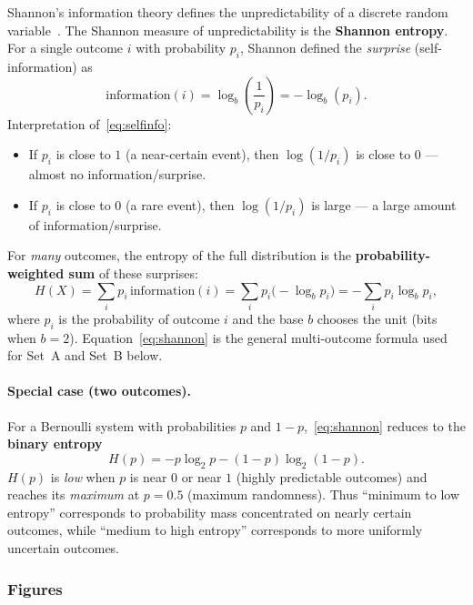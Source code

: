 \documentclass[12pt,a4paper]{article}
\begin{document}
Shannon's information theory defines the unpredictability of a discrete
random variable~\cite{He2018}. The Shannon measure of unpredictability is the
\textbf{Shannon entropy}. For a single outcome \(i\) with probability \(p_i\),
Shannon defined the \emph{surprise} (self-information) as
\begin{equation}
  \mathrm{information}(i)
    = \log_b\!\left(\frac{1}{p_i}\right)
    = -\log_b(p_i).
  \label{eq:selfinfo}
\end{equation}
Interpretation of~\eqref{eq:selfinfo}:
\begin{itemize}
  \item If \(p_i\) is close to \(1\) (a near-certain event), then
        \(\log(1/p_i)\) is close to \(0\) --- almost no information/surprise.
  \item If \(p_i\) is close to \(0\) (a rare event), then
        \(\log(1/p_i)\) is large --- a large amount of information/surprise.
\end{itemize}

For \emph{many} outcomes, the entropy of the full distribution is the
\textbf{probability-weighted sum} of these surprises:
\begin{equation}
  H(X)
    = \sum_{i} p_i \,\mathrm{information}(i)
    = \sum_{i} p_i \bigl(-\log_b p_i\bigr)
    = -\sum_{i} p_i \log_b p_i,
  \label{eq:shannon}
\end{equation}
where \(p_i\) is the probability of outcome \(i\) and the base \(b\) chooses
the unit (bits when \(b=2\)). Equation~\eqref{eq:shannon} is the general
multi-outcome formula used for Set~A and Set~B below.

\paragraph{Special case (two outcomes).}
For a Bernoulli system with probabilities \(p\) and \(1-p\),~\eqref{eq:shannon}
reduces to the \textbf{binary entropy}
\begin{equation}
  H(p) = -p\log_2 p - (1-p)\log_2(1-p).
\end{equation}
\(H(p)\) is \emph{low} when \(p\) is near \(0\) or near \(1\) (highly
predictable outcomes) and reaches its \emph{maximum} at \(p=0.5\) (maximum
randomness). Thus ``minimum to low entropy'' corresponds to probability mass
concentrated on nearly certain outcomes, while ``medium to high entropy''
corresponds to more uniformly uncertain outcomes.

\subsubsection*{Figures}
\end{document}
